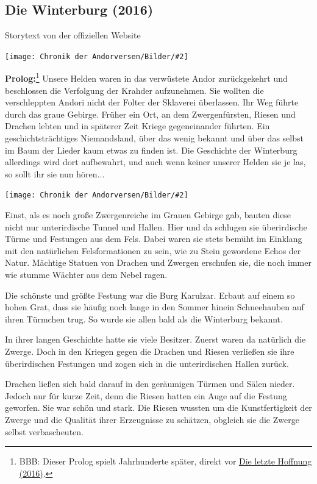 \documentclass[10pt, a4paper, oneside]{book}
\newcommand{\storytext}[1]{%
    \section{#1}%
    \label{Storytext: #1}%
}
\newcommand{\refprodukt}[1]{\hyperref[Produkt: #1]{#1}}
\newcommand{\bildmitts}[2][height=0.32\textwidth,width=0.48\textwidth,keepaspectratio]{%
    \begin{center}
        \texttt{[image: Chronik der Andorversen/Bilder/\#2]}
    \end{center}
}
\begin{document}
\begin{multicols}{2}
\newpage %

\storytext{Die Winterburg (2016)}

\begin{center}
    Storytext von der offiziellen Website
\end{center}

\bildmitts{Die Winterburg (2016).jpeg}

\textbf{Prolog:}\footnote{BBB: Dieser Prolog spielt Jahrhunderte später, direkt vor \refprodukt{Die letzte Hoffnung (2016)}.} Unsere Helden waren in das verwüstete Andor zurückgekehrt und beschlossen die Verfolgung der Krahder aufzunehmen. Sie wollten die verschleppten Andori nicht der Folter der Sklaverei überlassen. Ihr Weg führte durch das graue Gebirge. Früher ein Ort, an dem Zwergenfürsten, Riesen und Drachen lebten und in späterer Zeit Kriege gegeneinander führten. Ein geschichtsträchtiges Niemandsland, über das wenig bekannt und über das selbst im Baum der Lieder kaum etwas zu finden ist. Die Geschichte der Winterburg allerdings wird dort aufbewahrt, und auch wenn keiner unserer Helden sie je las, so sollt ihr sie nun hören...

\bildmitts{Die Winterburg Bild 1.jpg}

Einst, als es noch große Zwergenreiche im Grauen Gebirge gab, bauten diese nicht nur unterirdische Tunnel und Hallen. Hier und da schlugen sie überirdische Türme und Festungen aus dem Fels. Dabei waren sie stets bemüht im Einklang mit den natürlichen Felsformationen zu sein, wie zu Stein gewordene Echos der Natur. Mächtige Statuen von Drachen und Zwergen erschufen sie, die noch immer wie stumme Wächter aus dem Nebel ragen.\bigskip

Die schönste und größte Festung war die Burg Karulzar. Erbaut auf einem so hohen Grat, dass sie häufig noch lange in den Sommer hinein Schneehauben auf ihren Türmchen trug. So wurde sie allen bald als die Winterburg bekannt.\bigskip

In ihrer langen Geschichte hatte sie viele Besitzer. Zuerst waren da natürlich die Zwerge. Doch in den Kriegen gegen die Drachen und Riesen verließen sie ihre überirdischen Festungen und zogen sich in die unterirdischen Hallen zurück.\bigskip

Drachen ließen sich bald darauf in den geräumigen Türmen und Sälen nieder. Jedoch nur für kurze Zeit, denn die Riesen hatten ein Auge auf die Festung geworfen. Sie war schön und stark. Die Riesen wussten um die Kunstfertigkeit der Zwerge und die Qualität ihrer Erzeugnisse zu schätzen, obgleich sie die Zwerge selbst verbascheuten.\bigskip


\end{multicols}
\end{document}
